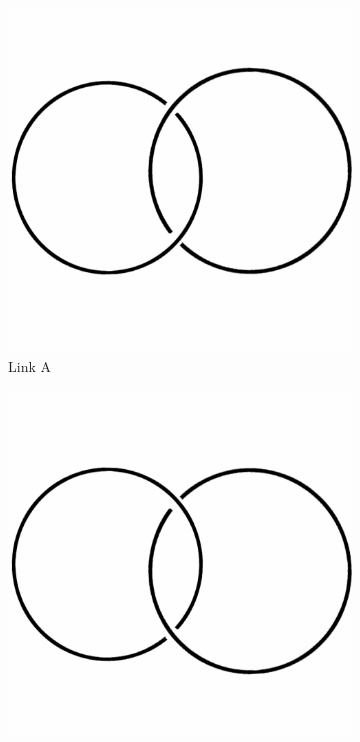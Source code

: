 \documentclass[12pt,letterpaper]{article}
\theoremstyle{definition}
\begin{document}
\begin{figure}[h]
    \centering
    \begin{subfigure}{.3\textwidth}
        \centering
        \includegraphics[width=\textwidth]{meeting11pics/hopf.png}
        \caption{Link A}
    \end{subfigure}
    \quad
    \begin{subfigure}{.3\textwidth}
        \centering
        \includegraphics[width=\textwidth]{meeting11pics/hopfmirror.png}

\end{subfigure}
\end{figure}
\end{document}
